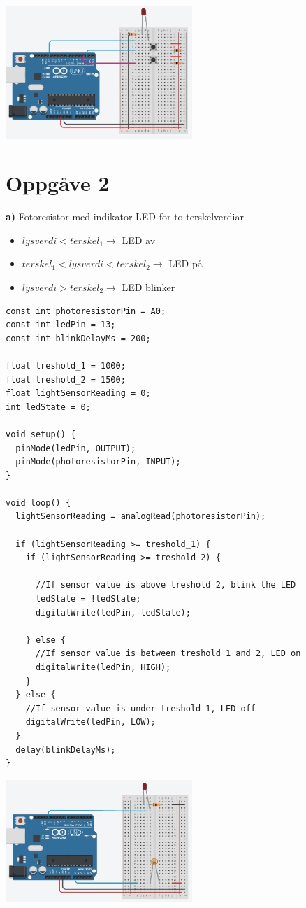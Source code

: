 \documentclass[12pt,a4paper]{article}
\begin{document}
  \begin{center}
    \includegraphics[width=200pt]{01_1_e.png}
  \end{center}

  \section{Oppgåve 2}
  \textbf{a)}
  Fotoresistor med indikator-LED for to terskelverdiar
  \begin{itemize}
    \item $lysverdi < terskel_1 \rightarrow$ LED av
    \item $terskel_1 < lysverdi < terskel_2 \rightarrow$ LED på
    \item $lysverdi > terskel_2 \rightarrow$ LED blinker
  \end{itemize}

  \begin{lstlisting}[language=Arduino, basicstyle=\tiny]
const int photoresistorPin = A0;
const int ledPin = 13;
const int blinkDelayMs = 200;

float treshold_1 = 1000;
float treshold_2 = 1500;
float lightSensorReading = 0;
int ledState = 0;

void setup() {
  pinMode(ledPin, OUTPUT);
  pinMode(photoresistorPin, INPUT);
}

void loop() {
  lightSensorReading = analogRead(photoresistorPin);

  if (lightSensorReading >= treshold_1) {
    if (lightSensorReading >= treshold_2) {
      
      //If sensor value is above treshold 2, blink the LED
      ledState = !ledState;
      digitalWrite(ledPin, ledState);
      
    } else {
      //If sensor value is between treshold 1 and 2, LED on
      digitalWrite(ledPin, HIGH);      
    }
  } else {
    //If sensor value is under treshold 1, LED off
    digitalWrite(ledPin, LOW);    
  }
  delay(blinkDelayMs);
}
  \end{lstlisting}
  \begin{center}
    \includegraphics[width=200pt]{01_2_a.png}
  \end{center}
\end{document}
